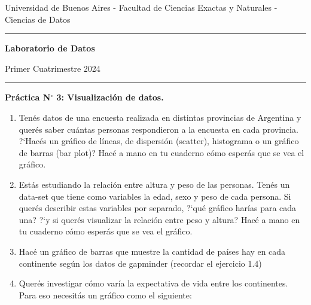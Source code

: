 \documentclass[a4paper,11pt]{article}
\theoremstyle{definition}
\begin{document}
\centerline{{\small Universidad de Buenos Aires - Facultad de Ciencias Exactas y Naturales - Ciencias de Datos}}

\vskip 0.2cm

\hrule

\vskip 0.2cm

 \centerline{{\bf\Large{\sc Laboratorio de Datos}}}

 \vskip 0.2cm

 \centerline{\ttfamily Primer Cuatrimestre 2024}

\vskip 0.2cm

 \hrule

 \bigskip
 \centerline{\bf Práctica N$^\circ$ 3: Visualizaci\'on de datos.}
 \bigskip



\begin{enumerate}[resume]
\item Ten\'es datos de una encuesta realizada en distintas provincias de Argentina y quer\'es saber cu\'antas personas respondieron a la encuesta en cada provincia. ?`Hac\'es un gr\'afico de l\'ineas, de dispersi\'on (scatter), histograma o un gr\'afico de barras (bar plot)? Hac\'e a mano en tu cuaderno c\'omo esper\'as que se vea el gr\'afico.

\item Est\'as estudiando la relaci\'on entre altura y peso de las personas. Ten\'es un data-set que tiene como variables la edad, sexo y peso de cada persona. Si quer\'es describir estas variables por separado, ?`qu\'e gr\'afico har\'ias para cada una? ?`y si quer\'es visualizar la relaci\'on entre peso y altura? Hac\'e a mano en tu cuaderno c\'omo esper\'as que se vea el gr\'afico.

\item Hac\'e un gr\'afico de barras que muestre la cantidad de pa\'ises hay en cada continente seg\'un los datos de gapminder (recordar el ejercicio 1.4)

\item Quer\'es investigar c\'omo var\'ia la expectativa de vida entre los continentes. Para eso necesit\'as un gr\'afico como el siguiente:


\end{enumerate}
\end{document}
